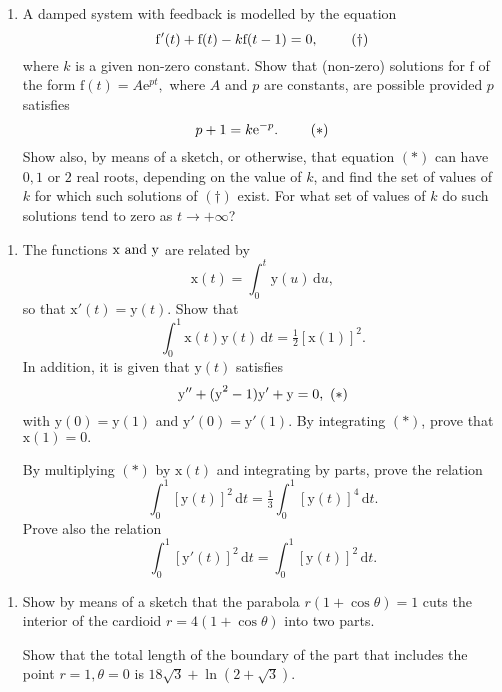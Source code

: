 \documentclass[a4, 11pt]{report}
\newlength{\qspace}
\newcounter{qnumber}
\newenvironment{question}%
 {\vspace{\qspace}
  \begin{enumerate}[\bfseries 1\quad][10]%
    \setcounter{enumi}{\value{qnumber}}%
    \item%
 }
{
  \end{enumerate}
  \filbreak
  \stepcounter{qnumber}
 }
\begin{document}
\begin{question}
	A damped system with feedback is modelled by the equation 
	\[
	\mathrm{f}'(t)+\mathrm{f}(t)-k\mathrm{f}(t-1)=0,\mbox{ }\tag{\ensuremath{\dagger}}
	\]
	where $k$ is a given non-zero constant. Show that (non-zero) solutions
	for $\mathrm{f}$ of the form \phantom{ } $\mathrm{f}(t)=A\mathrm{e}^{pt},$ where
	$A$ and $p$ are constants, are possible provided $p$ satisfies
	\[
	p+1=k\mathrm{e}^{-p}.\mbox{ }\tag{\ensuremath{*}}
	\]
	Show also, by means of a sketch, or otherwise, that equation $(*)$
	can have $0,1$ or $2$ real roots, depending on the value of $k$,
	and find the set of values of $k$ for which such solutions of $(\dagger)$
	exist. For what set of values of $k$ do such solutions tend to zero
	as $t\rightarrow+\infty$?
	\end{question}
	
	\begin{question}
The functions $\mbox{\ensuremath{\mathrm{x}} and \ensuremath{\mathrm{y}}}$
are related by 
\[
\mathrm{x}(t)=\int_{0}^{t}\mathrm{y}(u)\,\mathrm{d}u,
\]
so that $\mathrm{x}'(t)=\mathrm{y}(t)$. Show that 
\[
\int_{0}^{1}\mathrm{x}(t)\mathrm{y}(t)\,\mathrm{d}t=\tfrac{1}{2}\left[\mathrm{x}(1)\right]^{2}.
\]
In addition, it is given that $\mbox{y}(t)$ satisfies 
\[
\mathrm{y}''+\mbox{(\ensuremath{\mathrm{y}}}^{2}-1)\mathrm{y}'+\mathrm{y}=0,\mbox{ }(*)
\]
with $\mathrm{y}(0)=\mathrm{y}(1)$ and $\mathrm{y}'(0)=\mathrm{y}'(1)$.
By integrating $(*)$, prove that $\mathrm{x}(1)=0.$ 


By multiplying $(*)$ by $\mathrm{x}(t)$ and integrating by parts,
prove the relation 
\[
\int_{0}^{1}\left[\mathrm{y}(t)\right]^{2}\,\mathrm{d}t=\tfrac{1}{3}\int_{0}^{1}\left[\mathrm{y}(t)\right]^{4}\,\mathrm{d}t.
\]
Prove also the relation 
\[
\int_{0}^{1}\left[\mathrm{y}'(t)\right]^{2}\,\mathrm{d}t=\int_{0}^{1}\left[\mathrm{y}(t)\right]^{2}\,\mathrm{d}t.
\]

		\end{question}
		
		
		\begin{question}
Show by means of a sketch that the parabola $r(1+\cos\theta)=1$ cuts
the interior of the cardioid $r=4(1+\cos\theta)$ into two parts. 


Show that the total length of the boundary of the part that includes
the point $r=1,\theta=0$ is $18\sqrt{3}+\ln(2+\sqrt{3}).$ 
		\end{question}
		
\end{document}

